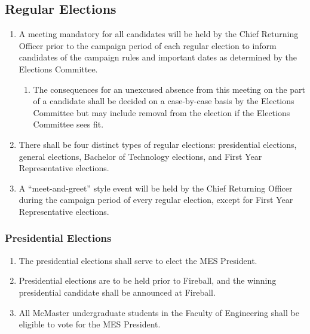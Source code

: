 \hypertarget{regular-elections}{%
 \subsection{Regular Elections}
 \label{regular-elections}}
\begin{enumerate}
 \item
  A meeting mandatory for all candidates will be held by the Chief
  Returning Officer prior to the campaign period of each regular
  election to inform candidates of the campaign rules and important
  dates as determined by the Elections Committee.

  \begin{enumerate}
   \item
    The consequences for an unexcused absence from this meeting on the
    part of a candidate shall be decided on a case-by-case basis by the
    Elections Committee but may include removal from the election if the
    Elections Committee sees fit.
  \end{enumerate}
 \item
  There shall be four distinct types of regular elections: presidential
  elections, general elections, Bachelor of Technology elections, and
  First Year Representative elections.
 \item
  A ``meet-and-greet'' style event will be held by the Chief Returning
  Officer during the campaign period of every regular election, except
  for First Year Representative elections.

\end{enumerate}

\hypertarget{presidential-elections}{%
 \subsubsection{Presidential
  Elections}
 \label{presidential-elections}}
\begin{enumerate}
 \item
  The presidential elections shall serve to elect the MES President.
 \item
  Presidential elections are to be held prior to Fireball, and the
  winning presidential candidate shall be announced at Fireball.
 \item
  All McMaster undergraduate students in the Faculty of Engineering
  shall be eligible to vote for the MES President.

\end{enumerate}

